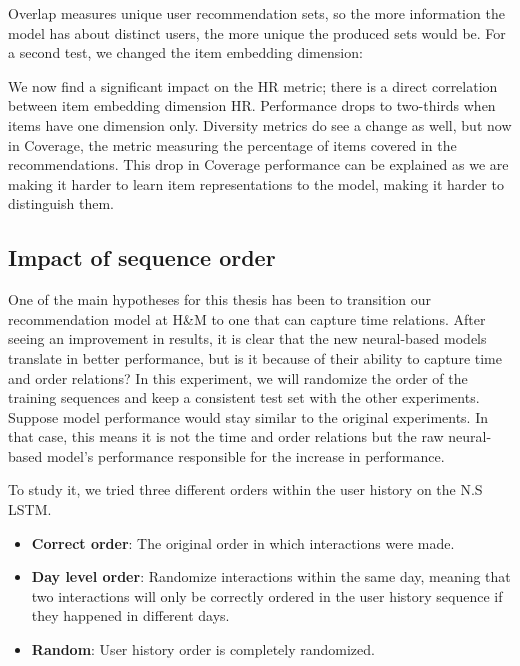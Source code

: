 \documentclass{tex_files/kththesis}
\begin{document}
Overlap measures unique user recommendation sets, so the more information the model has about distinct users, the more unique the produced sets would be. For a second test, we changed the item embedding dimension:

\begin{center}

\end{center}

We now find a significant impact on the HR metric; there is a direct correlation between item embedding dimension HR. Performance drops to two-thirds when items have one dimension only. Diversity metrics do see a change as well, but now in Coverage, the metric measuring the percentage of items covered in the recommendations. This drop in Coverage performance can be explained as we are making it harder to learn item representations to the model, making it harder to distinguish them. 


\subsection{Impact of sequence order}
One of the main hypotheses for this thesis has been to transition our recommendation model at H\&M to one that can capture time relations. After seeing an improvement in results, it is clear that the new neural-based models translate in better performance, but is it because of their ability to capture time and order relations? In this experiment, we will randomize the order of the training sequences and keep a consistent test set with the other experiments. Suppose model performance would stay similar to the original experiments. In that case, this means it is not the time and order relations but the raw neural-based model's performance responsible for the increase in performance. 

To study it, we tried three different orders within the user history on the N.S LSTM. 

\begin{itemize}
    \item \textbf{Correct order}: The original order in which interactions were made.
    \item \textbf{Day level order}: Randomize interactions within the same day, meaning that two interactions will only be correctly ordered in the user history sequence if they happened in different days.
    \item \textbf{Random}: User history order is completely randomized.
\end{itemize}
\end{document}
